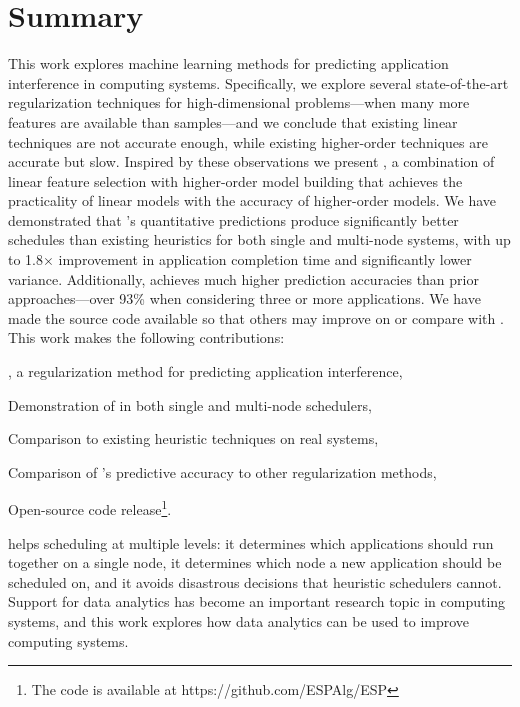 \section{Summary}

This work explores machine learning methods for predicting
application interference in computing systems.  Specifically, we
explore several state-of-the-art regularization techniques for
high-dimensional problems---when many more features are available than
samples---and we conclude that existing linear techniques are not
accurate enough, while existing higher-order techniques are accurate
but slow.  Inspired by these observations we present \SYSTEMESP{}, a
combination of linear feature selection with higher-order model
building that achieves the practicality of linear models with the
accuracy of higher-order models.  We have demonstrated that
\SYSTEMESP{}'s quantitative predictions produce significantly better
schedules than existing heuristics for both single and multi-node
systems, with up to 1.8$\times$ improvement in application completion
time and significantly lower variance.  Additionally, \SYSTEMESP{}
achieves much higher prediction accuracies than prior
approaches---over 93\% when considering three or more applications.
We have made the source code available so that others may improve on
or compare with \SYSTEMESP{}.
This work makes the following contributions:
\begin{inparaenum}[1)]
\item \SYSTEMESP{}, a regularization method for predicting application
  interference,
\item Demonstration of \SYSTEMESP{} in both single and multi-node
  schedulers,
\item Comparison to existing heuristic techniques on real systems,
\item Comparison of \SYSTEMESP{}'s predictive accuracy to other
  regularization methods,
\item Open-source code release\footnote{The code is available at
    https://github.com/ESPAlg/ESP}.
\end{inparaenum}
\SYSTEMESP{} helps scheduling at multiple levels: it determines which
applications should run together on a single node, it determines which
node a new application should be scheduled on, and it avoids
disastrous decisions that heuristic schedulers cannot.  Support for
data analytics has become an important research topic in computing
systems, and this work explores how data analytics can be used to
improve computing systems.



